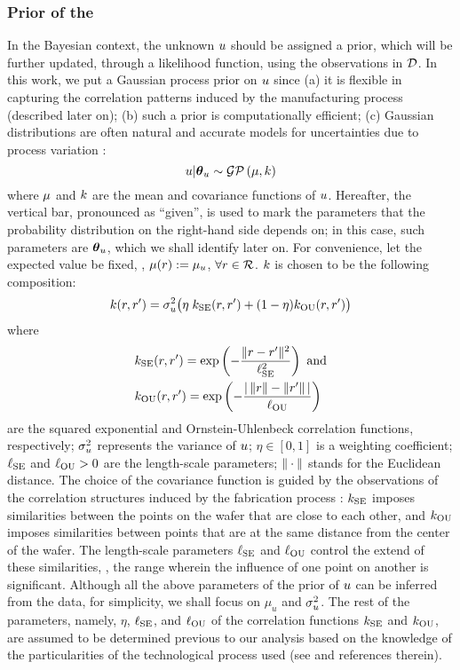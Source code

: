 \subsubsection{Prior of the \qoi}
In the Bayesian context, the unknown $u$ should be assigned a prior, which will be further updated, through a likelihood function, using the observations in $\mathcal{D}$. In this work, we put a Gaussian process prior \cite{rasmussen2006} on $u$ since (a) it is flexible in capturing the correlation patterns induced by the manufacturing process (described later on); (b) such a prior is computationally efficient; (c) Gaussian distributions are often natural and accurate models for uncertainties due to process variation \cite{srivastava2010, juan2011, juan2012}:
\[
  \u | \vparam_\u \sim \gaussianp{\fMean}{\fCov}
\]
where $\fMean$ and $\fCov$ are the mean and covariance functions of $u$. Hereafter, the vertical bar, pronounced as ``given'', is used to mark the parameters that the probability distribution on the right-hand side depends on; in this case, such parameters are ${\boldsymbol\theta}_u$, which we shall identify later on. For convenience, let the expected value be fixed, \ie, $\fMean{\r} := \mu_\u$, $\forall r \in \mathcal{R}$.
$\fCov$ is chosen to be the following composition:
\begin{equation} \elabel{covariance-function}
  \fCov{\r, \r'} = \sigma_\u^2 \big( \eta \; \fCov_\SE(\r, \r') + (1 - \eta) \fCov_\OU(\r, \r') \big)
\end{equation}
where
\begin{align*}
  & \fCov_\SE(\r, \r') = \exp\left(-\frac{\norm{\r - \r'}^2}{\ell_\SE^2}\right) \text{ and} \\
  & \fCov_\OU(\r, \r') = \exp\left(- \frac{\abs{\,\norm{\r} - \norm{\r'}\,}}{\ell_\OU} \right)
\end{align*}
are the squared exponential and Ornstein-Uhlenbeck correlation functions, respectively; $\sigma_u^2$ represents the variance of $u$; $\eta \in [0, 1]$ is a weighting coefficient; $\ell_{\text{SE}}$ and $\ell_{\text{OU}} > 0$ are the length-scale parameters; $\| \cdot \|$ stands for the Euclidean distance.
The choice of the covariance function is guided by the observations of the correlation structures induced by the fabrication process \cite{chandrakasan2001, cheng2011}: $\fCov_\SE$ imposes similarities between the points on the wafer that are close to each other, and $\fCov_\OU$ imposes similarities between points that are at the same distance from the center of the wafer.
The length-scale parameters $\ell_{\text{SE}}$ and $\ell_{\text{OU}}$ control the extend of these similarities, \ie, the range wherein the influence of one point on another is significant.
Although all the above parameters of the prior of $u$ can be inferred from the data, for simplicity, we shall focus on $\mu_u$ and $\sigma_u^2$.
The rest of the parameters, namely, $\eta$, $\ell_{\text{SE}}$, and $\ell_{\text{OU}}$ of the correlation functions $\fCov_\SE$ and $\fCov_\OU$, are assumed to be determined previous to our analysis based on the knowledge of the particularities of the technological process used (see \cite{marzouk2009} and references therein).

